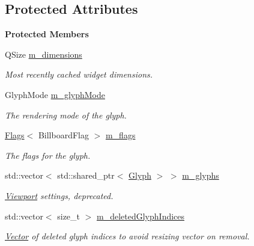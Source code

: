 \subsection*{Protected Attributes}
\begin{Indent}\textbf{ Protected Members}\par
\begin{DoxyCompactItemize}
\item 
\mbox{\label{classrev_1_1_canvas_component_a3d509bb4253d5ccd44f995907b4a6b7c}} 
Q\+Size \mbox{\hyperlink{classrev_1_1_canvas_component_a3d509bb4253d5ccd44f995907b4a6b7c}{m\+\_\+dimensions}}
\begin{DoxyCompactList}\small\item\em Most recently cached widget dimensions. \end{DoxyCompactList}\item 
\mbox{\label{classrev_1_1_canvas_component_a4b5101f7fc7280122760b0c1f0fc08fe}} 
Glyph\+Mode \mbox{\hyperlink{classrev_1_1_canvas_component_a4b5101f7fc7280122760b0c1f0fc08fe}{m\+\_\+glyph\+Mode}}
\begin{DoxyCompactList}\small\item\em The rendering mode of the glyph. \end{DoxyCompactList}\item 
\mbox{\label{classrev_1_1_canvas_component_a7939896e50934a12ef1e6e17f1a00277}} 
\mbox{\hyperlink{classrev_1_1_flags}{Flags}}$<$ Billboard\+Flag $>$ \mbox{\hyperlink{classrev_1_1_canvas_component_a7939896e50934a12ef1e6e17f1a00277}{m\+\_\+flags}}
\begin{DoxyCompactList}\small\item\em The flags for the glyph. \end{DoxyCompactList}\item 
std\+::vector$<$ std\+::shared\+\_\+ptr$<$ \mbox{\hyperlink{classrev_1_1_glyph}{Glyph}} $>$ $>$ \mbox{\hyperlink{classrev_1_1_canvas_component_a3f46cf00013223f6b45b9b3403b7b8de}{m\+\_\+glyphs}}
\begin{DoxyCompactList}\small\item\em \mbox{\hyperlink{classrev_1_1_viewport}{Viewport}} settings, deprecated. \end{DoxyCompactList}\item 
\mbox{\label{classrev_1_1_canvas_component_a37318fbecf18c41ff3a283d6c40c924c}} 
std\+::vector$<$ size\+\_\+t $>$ \mbox{\hyperlink{classrev_1_1_canvas_component_a37318fbecf18c41ff3a283d6c40c924c}{m\+\_\+deleted\+Glyph\+Indices}}
\begin{DoxyCompactList}\small\item\em \mbox{\hyperlink{classrev_1_1_vector}{Vector}} of deleted glyph indices to avoid resizing vector on removal. \end{DoxyCompactList}\end{DoxyCompactItemize}
\end{Indent}
